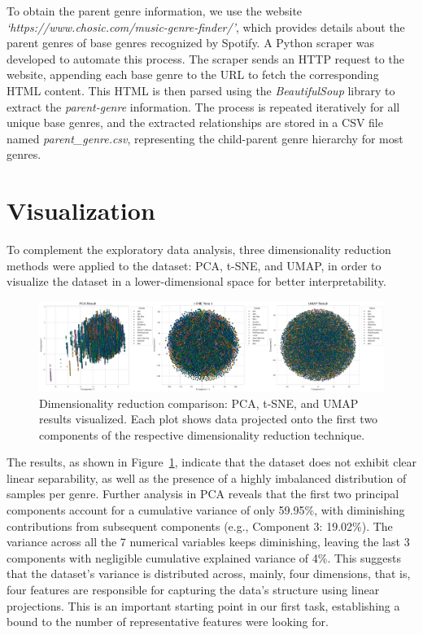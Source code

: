 \documentclass{article}
\begin{document}
To obtain the parent genre information, we use the website \textit{`https://www.chosic.com/music-genre-finder/'}, which provides details about the parent genres of base genres recognized by Spotify. A Python scraper was developed to automate this process. The scraper sends an HTTP request to the website, appending each base genre to the URL to fetch the corresponding HTML content. This HTML is then parsed using the \textit{BeautifulSoup} library to extract the \textit{parent-genre} information. The process is repeated iteratively for all unique base genres, and the extracted relationships are stored in a CSV file named \textit{parent\_genre.csv}, representing the child-parent genre hierarchy for most genres.

\section{Visualization}
\label{appendix:dim_red}

To complement the exploratory data analysis, three dimensionality reduction methods were applied to the dataset: PCA, t-SNE, and UMAP, in order to visualize the dataset in a lower-dimensional space for better interpretability.

\begin{figure}[ht]
    \centering
    \includegraphics[width=\textwidth]{Dimensionality_Reduction_Comparison.png}
    \caption{Dimensionality reduction comparison: PCA, t-SNE, and UMAP results visualized. Each plot shows data projected onto the first two components of the respective dimensionality reduction technique.}
    \label{fig:dimensionality_reduction}
\end{figure}                

The results, as shown in Figure~\ref{fig:dimensionality_reduction}, indicate that the dataset does not exhibit clear linear separability, as well as the presence of a highly imbalanced distribution of samples per genre. Further analysis in PCA reveals that the first two principal components account for a cumulative variance of only 59.95\%, with diminishing contributions from subsequent components (e.g., Component 3: 19.02\%). The variance across all the 7 numerical variables keeps diminishing, leaving the last 3 components with negligible cumulative explained variance of 4\%. This suggests that the dataset's variance is distributed across, mainly, four dimensions, that is, four features are  responsible for capturing the data's structure using linear projections.
This is an important starting point in our first task, establishing a bound to the number of representative features were looking for.
\end{document}
